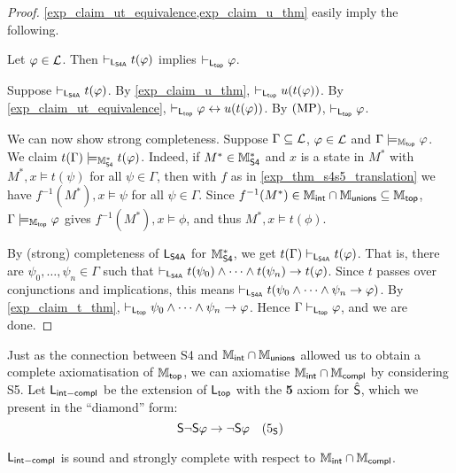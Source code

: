 \begin{proof}
\cref{exp_claim_ut_equivalence,exp_claim_u_thm} easily imply the following.

\begin{claim}
\label{exp_claim_t_thm}

Let $\phi \in \cL$. Then
$\entails_{\sLsfoura} t(\phi)$ implies $\entails_{\sLtop}
\phi$.

\end{claim}

    \begin{claimproof}
    Suppose $\entails_{\sLsfoura} t(\phi)$. By \cref{exp_claim_u_thm},
$\entails_{\sLtop} u(t(\phi))$. By \cref{exp_claim_ut_equivalence},
$\entails_{\sLtop} \phi \liff u(t(\phi))$. By
$\modpon$, $\entails_{\sLtop} \phi$.
    \end{claimproof}

We can now show strong completeness. Suppose $\Gamma \subseteq \cL$, $\phi \in
\cL$ and $\Gamma \models_{\Mtop} \phi$. We claim $t(\Gamma) \models_{\Msfour}
t(\phi)$. Indeed, if $M^* \in \Msfour$ and $x$ is a state in $M^*$ with $M^*, x
\models t(\psi)$ for all $\psi \in \Gamma$, then with $f$ as in
\cref{exp_thm_s4s5_translation} we have $f^{-1}(M^*), x \models \psi$ for all $\psi
\in \Gamma$. Since $f^{-1}(M^*) \in \Mint \cap \Munions \subseteq \Mtop$,
$\Gamma \models_{\Mtop} \phi$ gives $f^{-1}(M^*), x \models \phi$, and thus
$M^*, x \models t(\phi)$.

By (strong) completeness of $\sLsfoura$ for $\Msfour$, we get $t(\Gamma)
\entails_{\sLsfoura} t(\phi)$. That is, there are $\psi_0, \ldots, \psi_n \in
\Gamma$ such that $\entails_{\sLsfoura} t(\psi_0) \land \cdots \land t(\psi_n)
\limplies t(\phi)$. Since $t$ passes over conjunctions and implications, this
means $\entails_{\sLsfoura} t(\psi_0 \land \cdots \land \psi_n \limplies
\phi)$. By \cref{exp_claim_t_thm}, $\entails_{\sLtop} \psi_0 \land \cdots \land
\psi_n \limplies \phi$. Hence $\Gamma \entails_{\sLtop} \phi$, and we are done.
\end{proof}

Just as the connection between S4 and $\Mint \cap \Munions$ allowed us
to obtain a complete axiomatisation of $\Mtop$, we can axiomatise $\Mint \cap
\Mcompl$ by considering S5. Let $\sLintcompl$ be the extension of $\sLtop$
with the \textbf{5} axiom for $\hat\S$, which we present in the ``diamond''
form:
\[
    \S\neg\S\phi \limplies \neg\S\phi
    \quad
    \fivesoundness
\]

\begin{theorem}
\label{exp_thm_mintcompl_axiomatisation}
$\sLintcompl$ is sound and strongly complete with respect to
$\Mint \cap \Mcompl$.
\end{theorem}

